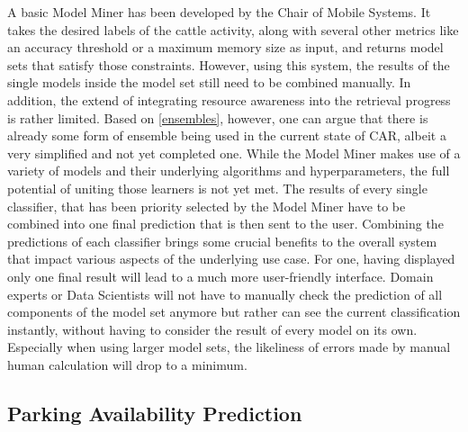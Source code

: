 A basic Model Miner has been developed by the Chair of Mobile Systems. It takes the desired labels of the cattle activity, along with several other metrics like an accuracy threshold or a maximum memory size as input, and returns model sets that satisfy those constraints. However, using this system, the results of the single models inside the model set still need to be combined manually. In addition, the extend of integrating resource awareness into the retrieval progress is rather limited. Based on \autoref{ensembles}, however, one can argue that there is already some form of ensemble being used in the current state of CAR, albeit a very simplified and not yet completed one. While the Model Miner makes use of a variety of models and their underlying algorithms and hyperparameters, the full potential of uniting those learners is not yet met. The results of every single classifier, that has been priority selected by the Model Miner have to be combined into one final prediction that is then sent to the user. Combining the predictions of each classifier brings some crucial benefits to the overall system that impact various aspects of the underlying use case. For one, having displayed only one final result will lead to a much more user-friendly interface. Domain experts or Data Scientists will not have to manually check the prediction of all components of the model set anymore but rather can see the current classification instantly, without having to consider the result of every model on its own. Especially when using larger model sets, the likeliness of errors made by manual human calculation will drop to a minimum. 


\subsection{Parking Availability Prediction}

